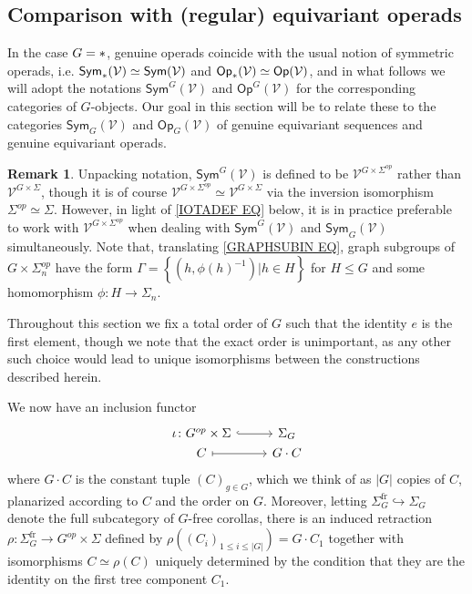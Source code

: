 \documentclass[a4paper,10pt
,draft
]{article}%
\numberwithin{equation}{section}
\numberwithin{figure}{section}
\theoremstyle{definition} %
\newtheorem{remark}[equation]{Remark}%
\newcommand{\1}{\ensuremath{\mathbbm 1}}%
\begin{document}
\subsection{Comparison with (regular) equivariant operads}
\label{COMPARISON_REGULAR_SECTION}

In the case $G = \**$, genuine operads coincide with the usual notion of symmetric operads, i.e. 
$\mathsf{Sym}_{\**}(\mathcal{V})
\simeq \mathsf{Sym}(\mathcal{V})$ 
and
$\mathsf{Op}_{\**}(\mathcal{V})
\simeq \mathsf{Op}(\mathcal{V})$, 
and in what follows we will adopt the notations
$\mathsf{Sym}^G(\mathcal{V})$ and
$\mathsf{Op}^G(\mathcal{V})$ 
for the corresponding categories of $G$-objects.
Our goal in this section will be to relate these to the categories
$\mathsf{Sym}_G(\mathcal{V})$ and $\mathsf{Op}_G(\mathcal{V})$
of genuine equivariant sequences and genuine equivariant operads.

\begin{remark}\label{TOOPORNOT REM}
	Unpacking notation,
	$\mathsf{Sym}^G(\mathcal{V})$ is defined to be
	$\mathcal{V}^{G \times \Sigma^{op}}$
	rather than 
	$\mathcal{V}^{G \times \Sigma}$,
	though it is of course  
	$\mathcal{V}^{G \times \Sigma^{op}}
	\simeq \mathcal{V}^{G \times \Sigma}$
	via the inversion isomorphism
	$\Sigma^{op} \simeq \Sigma$.
%	
	However, in light of \eqref{IOTADEF EQ} below, 
	it is in practice preferable to work with 
	$\mathcal{V}^{G \times \Sigma^{op}}$
	when dealing with $\mathsf{Sym}^G(\mathcal{V})$ and
	$\mathsf{Sym}_G(\mathcal{V})$ simultaneously.
%	
	Note that, translating \eqref{GRAPHSUBIN EQ}, 
	graph subgroups of
	$G \times \Sigma_n^{op}$
	have the form
	$\Gamma = \left\{(h,\phi(h)^{-1})|h\in H\right\}$
	for $H\leq G$
	and some homomorphism $\phi \colon H \to \Sigma_n$. 
\end{remark}


Throughout this section we fix a total order of $G$ such that the identity $e$ is the first element, though we note that the exact order is unimportant, as any other such choice would lead to unique isomorphisms between the constructions described herein.

We now have an inclusion functor
\begin{equation}\label{IOTADEF EQ}
\begin{tikzcd}[row sep =0]
	\iota \colon G^{op} \times \Sigma \ar[hookrightarrow]{r} &
	\Sigma_G
\\
	C \ar[mapsto]{r} & G \cdot C
\end{tikzcd}
\end{equation}
where $G \cdot C$ is the constant tuple $(C)_{g \in G}$,
which we think of as $|G|$ copies of $C$, planarized according to $C$ and the order on $G$.
Moreover, letting $\Sigma_G^{\text{fr}} \hookrightarrow \Sigma_G$ denote the full subcategory of $G$-free corollas, there is an induced retraction 
$\rho \colon \Sigma_{G}^{\text{fr}} \to G^{op} \times \Sigma$
defined by 
$\rho\left( (C_i)_{1\leq i \leq |G|} \right) = G \cdot C_1$
together with isomorphisms 
$C \simeq \rho(C)$
uniquely determined by the condition that they
are the identity on the first tree component $C_1$.
\end{document}
